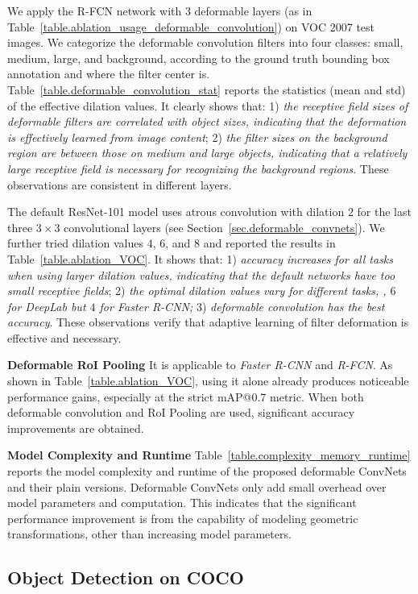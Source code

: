 \documentclass[10pt,twocolumn,letterpaper]{article}
\begin{document}
We apply the R-FCN network with $3$ deformable layers (as in Table~\ref{table.ablation_usage_deformable_convolution}) on VOC 2007 test images. We categorize the deformable convolution filters into four classes: small, medium, large, and background, according to the ground truth bounding box annotation and where the filter center is. Table~\ref{table.deformable_convolution_stat} reports the statistics (mean and std) of the effective dilation values. It clearly shows that: 1) \emph{the receptive field sizes of deformable filters are correlated with object sizes, indicating that the deformation is effectively learned from image content}; 2) \emph{the filter sizes on the background region are between those on medium and large objects, indicating that a relatively large receptive field is necessary for recognizing the background regions}. These observations are consistent in different layers.

The default ResNet-101 model uses atrous convolution with dilation $2$ for the last three $3\times 3$ convolutional layers (see Section~\ref{sec.deformable_convnets}). We further tried dilation values $4$, $6$, and $8$ and reported the results in Table~\ref{table.ablation_VOC}. It shows that: 1) \emph{accuracy increases for all tasks when using larger dilation values, indicating that the default networks have too small receptive fields}; 2) \emph{the optimal dilation values vary for different tasks, \eg, $6$ for DeepLab but $4$ for Faster R-CNN;} 3) \emph{deformable convolution has the best accuracy}. These observations verify that adaptive learning of filter deformation is effective and necessary.

\textbf{Deformable RoI Pooling} It is applicable to \emph{Faster R-CNN} and \emph{R-FCN}. As shown in Table~\ref{table.ablation_VOC}, using it alone already produces noticeable performance gains, especially at the strict mAP@0.7 metric. When both deformable convolution and RoI Pooling are used, significant accuracy improvements are obtained.

\textbf{Model Complexity and Runtime} Table~\ref{table.complexity_memory_runtime} reports the model complexity and runtime of the proposed deformable ConvNets and their plain versions. Deformable ConvNets only add small overhead over model parameters and computation. This indicates that the significant performance improvement is from the capability of modeling geometric transformations, other than increasing model parameters.

\subsection{Object Detection on COCO}
\label{sec.experiment_comparison}
\end{document}
